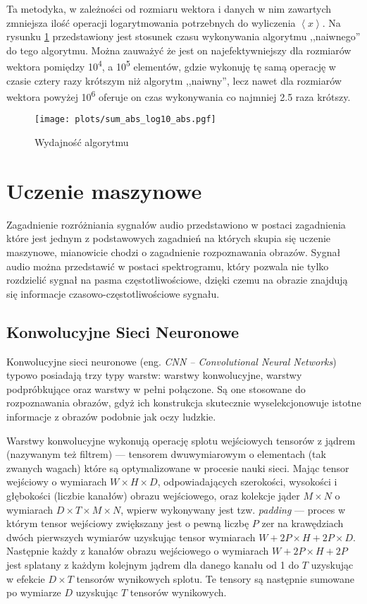 \documentclass[pl,12pt]{aghdpl}
\let\Oldsection\section%
\renewcommand{\section}{\FloatBarrier\Oldsection}
\let\Oldsubsection\subsection%
\renewcommand{\subsection}{\FloatBarrier\Oldsubsection}
\begin{document}
Ta metodyka, w zależności od rozmiaru wektora i danych w nim zawartych
zmniejsza ilość operacji logarytmowania potrzebnych do wyliczenia
$\left<x\right>$. Na rysunku \ref{fig:sum_abs_log_abs} przedstawiony jest
stosunek czasu wykonywania algorytmu ,,naiwnego'' do tego algorytmu. Można
zauważyć że jest on najefektywniejszy dla rozmiarów wektora pomiędzy
10\textsuperscript{4}, a 10\textsuperscript{5} elementów, gdzie wykonuję tę samą
operację w czasie cztery razy krótszym niż algorytm ,,naiwny'', lecz nawet dla
rozmiarów wektora powyżej 10\textsuperscript{6} oferuje on czas wykonywania co
najmniej \num{2.5} raza krótszy.
\begin{figure}[!tbh]
  \centering
  \texttt{[image: plots/sum\_abs\_log10\_abs.pgf]}
  \caption{Wydajność algorytmu}
  \label{fig:sum_abs_log_abs}
\end{figure}

\section{Uczenie maszynowe}
Zagadnienie rozróżniania sygnałów audio przedstawiono w postaci zagadnienia
które jest jednym z podstawowych zagadnień na których skupia się uczenie
maszynowe, mianowicie chodzi o zagadnienie rozpoznawania obrazów. Sygnał audio
można przedstawić w postaci spektrogramu, który pozwala nie tylko rozdzielić
sygnał na pasma częstotliwościowe, dzięki czemu na obrazie znajdują się
informacje czasowo-częstotliwościowe sygnału.
\subsection{Konwolucyjne Sieci Neuronowe}
Konwolucyjne sieci neuronowe (eng. \textit{CNN -- Convolutional Neural
Networks}) typowo posiadają trzy typy warstw: warstwy konwolucyjne,
warstwy podpróbkujące oraz warstwy w pełni połączone. Są one stosowane do
rozpoznawania obrazów, gdyż ich konstrukcja skutecznie wyselekcjonowuje istotne
informacje z obrazów podobnie jak oczy ludzkie.

Warstwy konwolucyjne wykonują operację splotu wejściowych tensorów z jądrem
(nazywanym też filtrem) --- tensorem dwuwymiarowym o elementach (tak zwanych
wagach) które są optymalizowane w procesie nauki sieci. Mając tensor wejściowy
o wymiarach $W \times H \times D$, odpowiadających szerokości, wysokości i
głębokości (liczbie kanałów) obrazu wejściowego, oraz kolekcje jąder $M \times
N$ o wymiarach $D \times T \times M \times N$, wpierw wykonywany jest tzw.
\textit{padding} --- proces w którym tensor wejściowy zwiększany jest o pewną
liczbę $P$ zer na krawędziach dwóch pierwszych wymiarów uzyskując tensor
wymiarach $W+2P \times H+2P \times D$. Następnie każdy z kanałów obrazu
wejściowego o wymiarach $W+2P \times H+2P$ jest splatany z każdym kolejnym
jądrem dla danego kanału od 1 do $T$ uzyskując w efekcie $D\times T$ tensorów
wynikowych splotu. Te tensory są następnie sumowane po wymiarze $D$ uzyskując
$T$ tensorów wynikowych.
\end{document}
